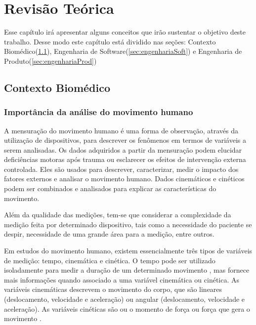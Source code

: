 
\chapter[Revisão Teórica]{Revisão Teórica}
  Esse capítulo irá apresentar alguns conceitos que irão sustentar o objetivo deste trabalho.
Desse modo este capítulo está dividido nas seções: Contexto Biomédico(\ref{sec:contextoBio}),
Engenharia de Software(\ref{sec:engenhariaSoft}) e Engenharia de Produto(\ref{sec:engenhariaProd})
\section{Contexto Biomédico}\label{sec:contextoBio}
\subsection{Importância da análise do movimento humano}

A mensuração do movimento humano é uma forma de observação, através da utilização
de dispositivos, para descrever os fenômenos em termos de variáveis a serem analisadas.
Os dados adquiridos a partir da mensuração podem elucidar deficiências
motoras após trauma ou esclarecer os efeitos de intervenção externa controlada.
Eles são usados para descrever, caracterizar, medir o impacto dos
fatores externos e analisar o movimento humano. Dados cinemáticos e cinéticos podem ser combinados
e analisados para explicar as características do movimento.

Além da qualidade das medições, tem-se que considerar a complexidade da medição
feita por determinado dispositivo, tais como a necessidade do paciente se despir,
necessidade de uma grande área para a medição, entre outros.

Em estudos do movimento humano, existem essencialmente três tipos de variáveis de medição: tempo,
cinemática e cinética. O tempo pode ser utilizado isoladamente para medir a duração de um determinado movimento
, mas fornece mais informações quando associado a uma variável cinemática ou cinética.
As variáveis cinemáticas descrevem o movimento do corpo, que são lineares (deslocamento,
velocidade e aceleração) ou angular (deslocamento, velocidade e aceleração).
 As variáveis cinéticas são ou o momento de força ou força que gera o movimento \cite{roberto}.

